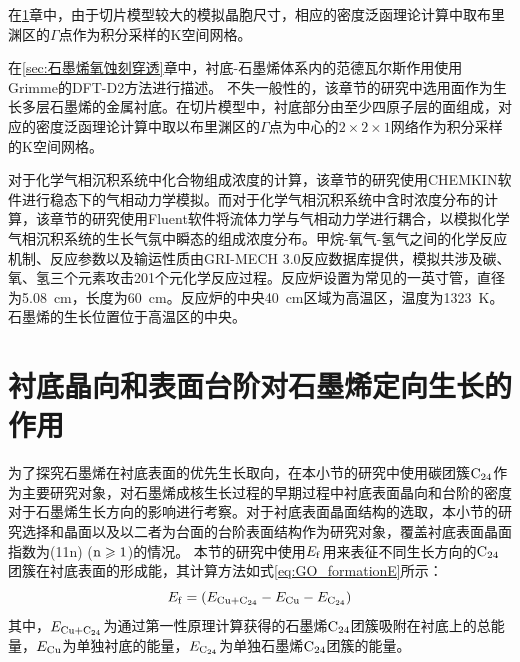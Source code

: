 在\ref{sec:石墨烯优先生长取向}章中，由于切片模型较大的模拟晶胞尺寸，相应的密度泛函理论计算中取布里渊区的$\Gamma$点作为积分采样的K空间网格。

在\ref{sec:石墨烯氧蚀刻穿透}章中，衬底-石墨烯体系内的范德瓦尔斯作用使用Grimme的DFT-D2方法进行描述。
不失一般性的，该章节的研究中选用面作为生长多层石墨烯的金属衬底。在切片模型中，衬底部分由至少四原子层的面组成，对应的密度泛函理论计算中取以布里渊区的$\Gamma$点为中心的$2\times 2\times 1$网络作为积分采样的K空间网格。

对于化学气相沉积系统中化合物组成浓度的计算，该章节的研究使用CHEMKIN软件进行稳态下的气相动力学模拟。而对于化学气相沉积系统中含时浓度分布的计算，该章节的研究使用Fluent软件将流体力学与气相动力学进行耦合，以模拟化学气相沉积系统的生长气氛中瞬态的组成浓度分布。甲烷-氧气-氢气之间的化学反应机制、反应参数以及输运性质由GRI-MECH 3.0反应数据库提供，模拟共涉及碳、氧、氢三个元素攻击201个元化学反应过程。反应炉设置为常见的一英寸管，直径为\SI{5.08}{\centi\metre}，长度为\SI{60}{\centi\metre}。反应炉的中央\SI{40}{\centi\metre}区域为高温区，温度为\SI{1323}{\kelvin}。石墨烯的生长位置位于高温区的中央。

\section{衬底晶向和表面台阶对石墨烯定向生长的作用}
\label{sec:石墨烯优先生长取向}
为了探究石墨烯在衬底表面的优先生长取向，在本小节的研究中使用碳团簇$\rm{C_{24}}$作为主要研究对象，对石墨烯成核生长过程的早期过程中衬底表面晶向和台阶的密度对于石墨烯生长方向的影响进行考察。对于衬底表面晶面结构的选取，本小节的研究选择和晶面以及以二者为台面的台阶表面结构作为研究对象，覆盖衬底表面晶面指数为(11n) ($\rm{n \geqslant 1}$)的情况。
本节的研究中使用$E_{\rm{f}}$用来表征不同生长方向的$\rm{C_{24}}$团簇在衬底表面的形成能，其计算方法如式\eqref{eq:GO_formationE}所示：
\begin{equation}
    \label{eq:GO_formationE}
    E_{\rm{f}}=
    (E_{\rm{Cu+\rm{C_{24}}}}-E_{\rm{Cu}}-E_{\rm{\rm{C_{24}}}})
\end{equation}
其中，$E_{\rm{Cu+\rm{C_{24}}}}$为通过第一性原理计算获得的石墨烯$\rm{C_{24}}$团簇吸附在衬底上的总能量，$E_{\rm{Cu}}$为单独衬底的能量，$E_{\rm{\rm{C_{24}}}}$为单独石墨烯$\rm{C_{24}}$团簇的能量。

